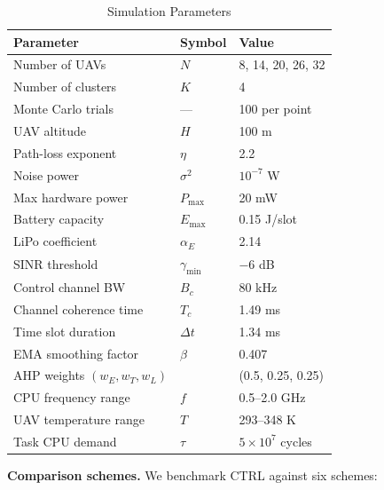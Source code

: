 \documentclass[journal]{IEEEtran}
\begin{document}
\begin{IEEEproof}
\begin{table}[!t]
\renewcommand{\arraystretch}{1.25}
\caption{Simulation Parameters}
\label{tab:params}
\centering
\begin{tabular}{lll}
\toprule
\textbf{Parameter} & \textbf{Symbol} & \textbf{Value} \\
\midrule
Number of UAVs           & $N$          & 8, 14, 20, 26, 32   \\
Number of clusters       & $K$          & 4                   \\
Monte Carlo trials       & ---          & 100 per point       \\
UAV altitude             & $H$          & 100 m               \\
Path-loss exponent       & $\eta$       & 2.2                 \\
Noise power              & $\sigma^2$   & $10^{-7}$ W         \\
Max hardware power       & $P_{\max}$   & 20 mW               \\
Battery capacity         & $E_{\max}$   & 0.15 J/slot         \\
LiPo coefficient         & $\alpha_E$   & 2.14                \\
SINR threshold           & $\gamma_{\min}$ & $-6$ dB          \\
Control channel BW       & $B_c$        & 80 kHz              \\
Channel coherence time   & $T_c$        & 1.49 ms             \\
Time slot duration       & $\Delta t$   & 1.34 ms             \\
EMA smoothing factor     & $\beta$      & 0.407               \\
AHP weights $(w_E,w_T,w_L)$ &          & (0.5, 0.25, 0.25)   \\
CPU frequency range      & $f$          & 0.5--2.0 GHz        \\
UAV temperature range    & $T$          & 293--348 K          \\
Task CPU demand          & $\tau$       & $5\times10^7$ cycles \\
\bottomrule
\end{tabular}
\end{table}

\smallskip
\noindent\textbf{Comparison schemes.}
We benchmark CTRL against six schemes:


\end{IEEEproof}
\end{document}
